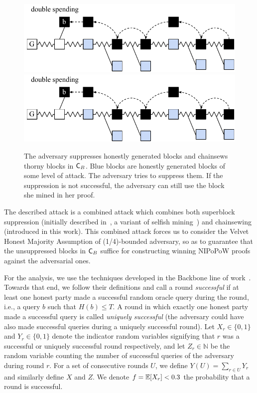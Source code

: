 \begin{figure}
    \begin{center}
        \iftwocolumn
            \includegraphics[width=0.95\columnwidth]{figures/attack_after_update-crop.pdf}
        \else
            \includegraphics[width=0.6\columnwidth]{figures/attack_after_update-crop.pdf}
        \fi
	\end{center}
	\caption{The adversary suppresses honestly generated blocks and chainsews thorny blocks in $\mathsf{C}_B$. Blue blocks are honestly generated blocks of some level of attack. The adversary tries to suppress them. If the suppression is not successful, the adversary can still use the block she mined in her proof.}
	\label{fig:attack_after_update}
\end{figure}

The described attack is a combined attack which combines both superblock suppression (initially described in~\cite{nipopows}, a variant of selfish mining~\cite{selfish}) and chainsewing (introduced in this work). This combined attack forces us to consider the Velvet Honest Majority Assumption of (1/4)-bounded adversary, so as to guarantee that the unsuppressed blocks in $\mathsf{C}_B$ suffice for constructing winning NIPoPoW proofs against the adversarial ones.

For the analysis, we use the techniques
developed in the Backbone line of work~\cite{backbone}. Towards that end, we
follow their definitions and call a round \emph{successful} if at least one
honest party made a successful random oracle query during the round, i.e., a
query $b$ such that $H(b) \leq T$. A round in which exactly one honest party
made a successful query is called \emph{uniquely successful} (the adversary
could have also made successful queries during a uniquely successful round). Let
$X_r \in \{0, 1\}$ and $Y_r \in \{0, 1\}$ denote the indicator random variables
signifying that $r$ was a successful or uniquely successful round respectively,
and let $Z_r \in \mathbb{N}$ be the random variable counting the number of
successful queries of the adversary during round $r$. For a set of consecutive
rounds $U$, we define $Y(U) = \sum_{r \in U} Y_r$ and similarly define $X$ and
$Z$. We denote $f = \operatorname{\mathbb{E}}[X_r] < 0.3$ the probability that a round is successful.

